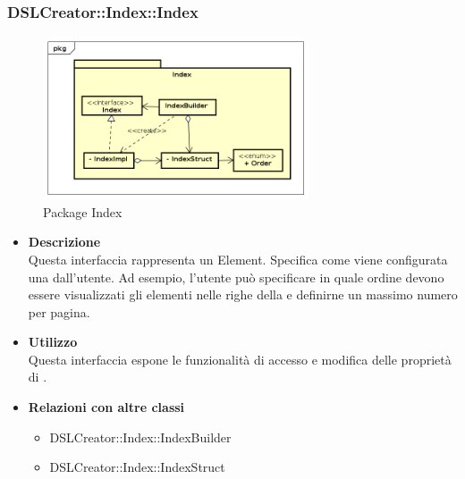  \subsubsection{DSLCreator::Index::Index}
                \begin{figure}[H]
                  \centering
                  \includegraphics[width=0.7\textwidth]{res/img/Index.png}
                  \caption{Package Index}
                  \label{fig:diagram_model}
                \end{figure}
                    \begin{itemize}
                        \item \textbf{Descrizione} \hfill \\
                            Questa interfaccia rappresenta un  Element. Specifica come viene configurata una  dall'utente. Ad esempio, l'utente può specificare in quale ordine devono essere visualizzati gli elementi nelle righe della  e definirne un massimo numero per pagina.
                        \item \textbf{Utilizzo} \hfill \\
                            Questa interfaccia espone le funzionalità di accesso e modifica delle proprietà di .
                        \item \textbf{Relazioni con altre classi}
                            \begin{itemize}
                              \item DSLCreator::Index::IndexBuilder
                              \item DSLCreator::Index::IndexStruct
                            \end{itemize}
                    \end{itemize}

